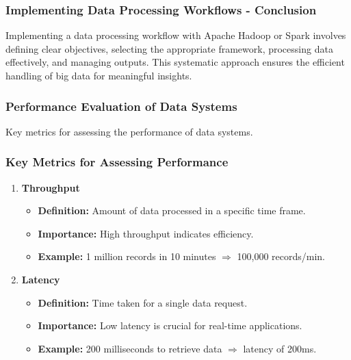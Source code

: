\documentclass[aspectratio=169]{beamer}
\begin{document}
\begin{frame}[fragile]
    \frametitle{Implementing Data Processing Workflows - Conclusion}
    Implementing a data processing workflow with Apache Hadoop or Spark involves defining clear objectives, 
    selecting the appropriate framework, processing data effectively, and managing outputs. 
    This systematic approach ensures the efficient handling of big data for meaningful insights.
\end{frame}

\begin{frame}[fragile]
    \frametitle{Performance Evaluation of Data Systems}
    Key metrics for assessing the performance of data systems.
\end{frame}

\begin{frame}[fragile]
    \frametitle{Key Metrics for Assessing Performance}
    \begin{enumerate}
        \item \textbf{Throughput}
            \begin{itemize}
                \item \textbf{Definition:} Amount of data processed in a specific time frame.
                \item \textbf{Importance:} High throughput indicates efficiency.
                \item \textbf{Example:} 1 million records in 10 minutes $\Rightarrow$ 100,000 records/min.
            \end{itemize}
        
        \item \textbf{Latency}
            \begin{itemize}
                \item \textbf{Definition:} Time taken for a single data request.
                \item \textbf{Importance:} Low latency is crucial for real-time applications.
                \item \textbf{Example:} 200 milliseconds to retrieve data $\Rightarrow$ latency of 200ms.
            \end{itemize}
    \end{enumerate}
\end{frame}
\end{document}

